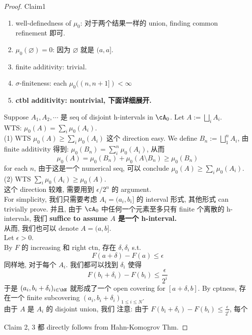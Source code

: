 \documentclass[lang=cn,11pt]{elegantbook}
\begin{document}
\begin{proof}
Claim1 
\begin{enumerate}
    \item well-definedness of $\mu_0$: 对于两个结果一样的 union, finding common refinement 即可.\\
    \item $\mu_0(\varnothing) = 0$: 因为 $\varnothing$ 就是 $(a,a]$.\\
    \item finite additivity: trivial.\\
    \item $\sigma$-finiteness: each $\mu_0((n, n+1]) < \infty$
    \item \textbf{ctbl additivity: nontrivial, 下面详细展开.}
\end{enumerate}
Suppose $A_1, A_2, \cdots$ 是 seq of disjoint h-intervals in $\cA_0$. Let $A := \bigsqcup_{i}A_i $.\\
WTS: $\mu_0(A) = \sum_i \mu_0(A_i)$.\\
(1) WTS $\mu_0(A) \geq \sum_i \mu_0(A_i)$
这个 direction easy. We define $B_n  := \bigsqcup_1^n A_i$, 由 finite additivity 得到: $\mu_0(B_n) = \sum_{i}^n \mu_0(A_i)$, 从而 
$$
\mu_0(A) = \mu_0(B_n) + \mu_0(A \setminus B_n) \geq \mu_0(B_n)
$$ for each $n$, 由于这是一个 numerical seq, 可以 conclude $\mu_0(A) \geq \sum_i \mu_0(A_i)$.
(2) WTS $\sum_i \mu_0(A_i) \geq \mu_0(A)$.\\
这个 direction 较难, 需要用到 $\epsilon / 2^n$ 的 argument.\\
For simplicity, 我们只需要考虑 $A_i = (a_i, b_i]$ 的 interval 形式, 其他形式 can trivially prove. 并且, 由于 $\cA_0$ 中任何一个元素至多只有 finite 个离散的 h-intervals, 我们 \textbf{suffice to assume $A$ 是一个 h-interval.} \\
从而, 我们也可以 denote $A = (a,b]$.\\
Let $\epsilon > 0$.\\
By $F$ 的 increasing 和 right ctn, 存在 $\delta, \delta_i$ s.t.
$$
F(a+ \delta)- F(a) \leq \epsilon
$$
同样地, 对于每个 $A_i$. 我们都可以找到 $\delta_i$ 使得 
$$
    F(b_i + \delta_i) - F(b_i) \leq \frac{\epsilon}{2^i}
$$
于是 $(a_i, b_i+\delta_i)_{i \in \bN}$ 就形成了一个 open covering for $[a+ \delta, b]$. By cptness, 存在一个 finite subcovering $(a_i, b_i+\delta_i)_{1 \leq i \leq N}$.\\
由于 $A$ 是 $A_i$ 的 disjoint union, 我们
注意: 由于 $ F(b_i + \delta_i) - F(b_i) \leq \frac{\epsilon}{2^i}$, 每个


Claim 2, 3 都 directly follows from Hahn-Komogrov Thm.
\end{proof}
\end{document}
